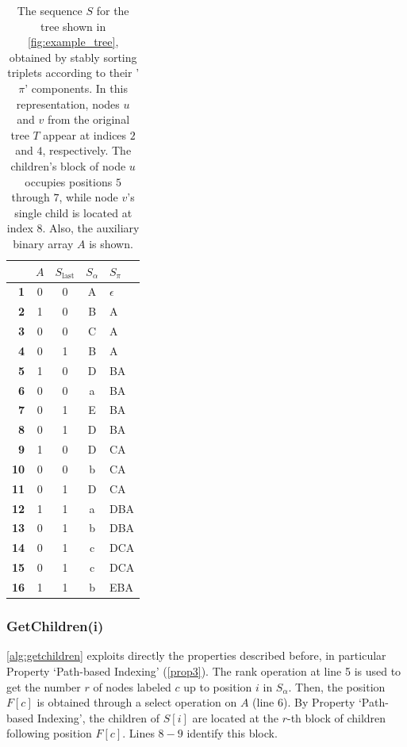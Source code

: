\begin{table}
    \centering
    \begin{tabular}{r c c c l}
    \hline\hline
    \textbf{} & $A$ & \textbf{$S_{\text{last}}$} & \textbf{$S_{\alpha}$} & \textbf{$S_{\pi}$} \\
    \hline
    \textbf{1} & 0 & 0 & A & $\epsilon$ \\
    \textbf{2} & 1 & 0 & B & A \\
    \textbf{3} & 0 & 0 & C & A \\
    \textbf{4} & 0 & 1 & B & A \\
    \textbf{5} & 1 & 0 & D & BA \\
    \textbf{6} & 0 & 0 & a & BA \\
    \textbf{7} & 0 & 1 & E & BA \\
    \textbf{8} & 0 & 1 & D & BA \\
    \textbf{9} & 1 & 0 & D & CA \\
    \textbf{10} & 0 & 0 & b & CA \\
    \textbf{11} & 0 & 1 & D & CA \\
    \textbf{12} & 1 & 1 & a & DBA \\
    \textbf{13} & 0 & 1 & b & DBA \\
    \textbf{14} & 0 & 1 & c & DCA \\
    \textbf{15} & 0 & 1 & c & DCA \\
    \textbf{16} & 1 & 1 & b & EBA \\
    \hline\hline
    \end{tabular}
    \caption{The sequence $S$ for the tree shown in \cref{fig:example_tree}, obtained by stably sorting triplets according to their '$\pi$' components. In this representation, nodes $u$ and $v$ from the original tree $T$ appear at indices $2$ and $4$, respectively. The children's block of node $u$ occupies positions $5$ through $7$, while node $v$'s single child is located at index $8$. Also, the auxiliary binary array $A$ is shown.}
    \label{tab:xbwt_example_2}
\end{table}

\subsubsection*{GetChildren(i)}
\cref{alg:getchildren} exploits directly the properties described before, in particular Property `Path-based Indexing' (\cref{prop3}). The rank operation at line 5 is used to get the number $r$ of nodes labeled $c$ up to position $i$ in $S_{\alpha}$. Then, the position $F[c]$ is obtained through a select operation on $A$ (line 6). By Property `Path-based Indexing', the children of $S[i]$ are located at the $r$-th block of children following position $F[c]$. Lines $8 - 9$ identify this block. 

